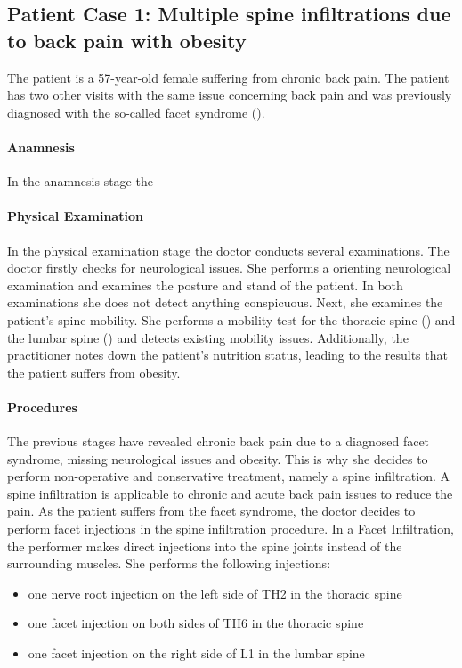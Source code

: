 \subsection{Patient Case 1: Multiple spine infiltrations due to back pain with obesity}\label{subsec:patient-a---multiple-spine-infiltrations-due-to-backpain-with-obesity}
The patient is a 57-year-old female suffering from chronic back pain.
The patient has two other visits with the same issue concerning back pain and was previously diagnosed with the so-called facet syndrome ().

\paragraph{Anamnesis}
In the anamnesis stage the

\paragraph{Physical Examination}
In the physical examination stage the doctor conducts several examinations.
The doctor firstly checks for neurological issues.
She performs a orienting neurological examination and examines the posture and stand of the patient.
In both examinations she does not detect anything conspicuous.
Next, she examines the patient's spine mobility.
She performs a mobility test for the thoracic spine () and the lumbar spine () and detects existing mobility issues.
Additionally, the practitioner notes down the patient's nutrition status, leading to the results that the patient suffers from obesity.

\paragraph{Procedures}
The previous stages have revealed chronic back pain due to a diagnosed facet syndrome, missing neurological issues and obesity.
This is why she decides to perform non-operative and conservative treatment, namely a spine infiltration.
A spine infiltration is applicable to chronic and acute back pain issues to reduce the pain.
As the patient suffers from the facet syndrome, the doctor decides to perform facet injections in the spine infiltration procedure.
In a Facet Infiltration, the performer makes direct injections into the spine joints instead of the surrounding muscles.
She performs the following injections:
\begin{itemize}
    \item one nerve root injection on the left side of TH2 in the thoracic spine
    \item one facet injection on both sides of TH6 in the thoracic spine
    \item one facet injection on the right side of L1 in the lumbar spine
\end{itemize}

